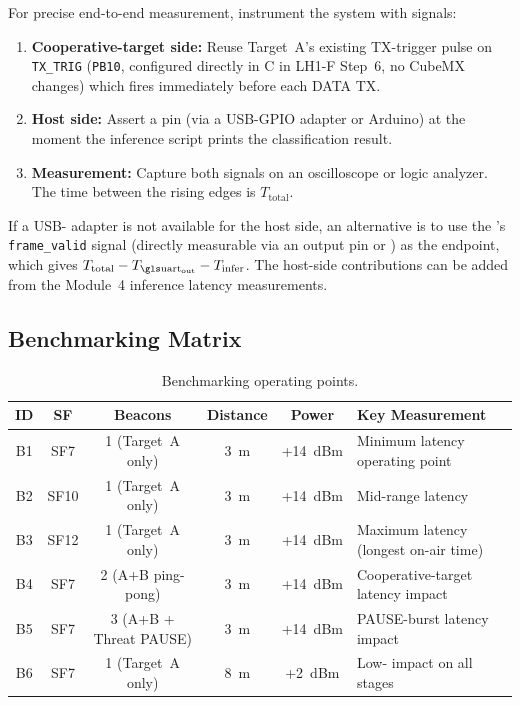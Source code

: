 \documentclass[11pt,letterpaper]{article}
\begin{document}
	For precise end-to-end measurement, instrument the system with \GPIO{} signals:

	\begin{enumerate}[leftmargin=2em]
		\item \textbf{Cooperative-target side:} Reuse Target~A's existing TX-trigger \GPIO{} pulse on \texttt{TX\_TRIG} (\texttt{PB10}, configured directly in C in LH1-F Step~6, no CubeMX changes) which fires immediately before each DATA TX.
		\item \textbf{Host side:} Assert a \GPIO{} pin (via a USB-GPIO adapter or Arduino) at the moment the inference script prints the classification result.
		\item \textbf{Measurement:} Capture both \GPIO{} signals on an oscilloscope or logic analyzer. The time between the rising edges is $T_{\text{total}}$.
	\end{enumerate}

	If a USB-\GPIO{} adapter is not available for the host side, an alternative is to use the \FPGA{}'s \texttt{frame\_valid} signal (directly measurable via an output pin or \ILA{}) as the endpoint, which gives $T_{\text{total}} - T_{\text{\UART{}\textsubscript{out}}} - T_{\text{infer}}$. The host-side contributions can be added from the Module~4 inference latency measurements.

	\subsection{Benchmarking Matrix}

	\begin{table}[ht!]
		\centering
		\caption{Benchmarking operating points.}
		\label{tab:benchmark_matrix}
		\renewcommand{\arraystretch}{1.3}
		\begin{tabularx}{\textwidth}{c c c c c X}
			\toprule
			\textbf{ID} & \textbf{SF} & \textbf{Beacons} & \textbf{Distance} & \textbf{Power} & \textbf{Key Measurement} \\
			\midrule
			B1 & SF7 & 1 (Target~A only) & 3~m & +14~dBm & Minimum latency operating point \\
			B2 & SF10 & 1 (Target~A only) & 3~m & +14~dBm & Mid-range latency \\
			B3 & SF12 & 1 (Target~A only) & 3~m & +14~dBm & Maximum latency (longest on-air time) \\
			B4 & SF7 & 2 (A+B ping-pong) & 3~m & +14~dBm & Cooperative-target latency impact \\
			B5 & SF7 & 3 (A+B + Threat PAUSE) & 3~m & +14~dBm & PAUSE-burst latency impact \\
			B6 & SF7 & 1 (Target~A only) & 8~m & +2~dBm & Low-\SNR{} impact on all stages \\
			\bottomrule
		\end{tabularx}
	\end{table}
\end{document}
